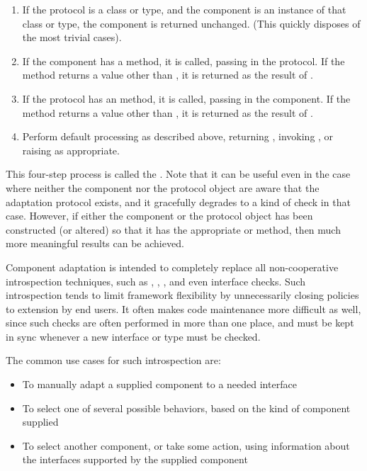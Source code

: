 \begin{enumerate}

\item If the protocol is a class or type, and the component is an instance
of that class or type, the component is returned unchanged.  (This quickly
disposes of the most trivial cases).

\item If the component has a  method, it is called,
passing in the protocol.  If the method returns a value other than
, it is returned as the result of .

\item If the protocol has an  method, it is called,
passing in the component.  If the method returns a value other than
, it is returned as the result of .

\item Perform default processing as described above, returning ,
invoking , or raising  as
appropriate.

\end{enumerate}

This four-step process is called the .  Note
that it can be useful even in the case where neither the component nor the
protocol object are aware that the adaptation protocol exists, and it
gracefully degrades to a kind of  check in that
case.  However, if either the component or the protocol object has been
constructed (or altered) so that it has the appropriate 
or  method, then much more meaningful results can be
achieved.

Component adaptation is intended to completely replace all non-cooperative
introspection techniques, such as , ,
, and even interface checks.  Such introspection
tends to limit framework flexibility by unnecessarily closing policies to
extension by end users.  It often makes code maintenance more difficult as
well, since such checks are often performed in more than one place, and
must be kept in sync whenever a new interface or type must be checked.

The common use cases for such introspection are:

\begin{itemize}

\item To manually adapt a supplied component to a needed interface

\item To select one of several possible behaviors, based on the kind of
component supplied

\item To select another component, or take some action, using information
about the interfaces supported by the supplied component

\end{itemize}

